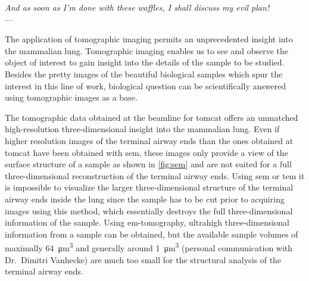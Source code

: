 \acresetall
{}\label{ch:discussion}
\begin{flushright}{\slshape And as soon as I'm done with these waffles, I shall discuss my evil plan!} \\ \medskip
	---  \citep{Zim}
\end{flushright}

\vfill

The application of tomographic imaging permits an unprecedented insight into the mammalian lung. Tomographic imaging enables us to see and observe the object of interest to gain insight into the details of the sample to be studied. Besides the pretty images of the beautiful biological samples which spur the interest in this line of work, biological question can be scientifically answered using tomographic images as a base.

The tomographic data obtained at the beamline for \ac{tomcat} offers an unmatched high-resolution three-dimensional insight into the mammalian lung. Even if higher resolution images of the terminal airway ends than the ones obtained at \ac{tomcat} have been obtained with \ac{sem}, these images only provide a view of the surface structure of a sample as shown in \autoref{fig:sem} and are not suited for a full three-dimensional reconstruction of the terminal airway ends. Using \ac{sem} or \ac{tem} it is impossible to visualize the larger three-dimensional structure of the terminal airway ends inside the lung since the sample has to be cut prior to acquiring images using this method, which essentially destroys the full three-dimensional information of the sample. Using \ac{em}-tomography, ultrahigh three-dimensional information from a sample can be obtained, but the available sample volumes of maximally \SI{64}{\micro\meter\cubed} and generally around \SI{1}{\micro\meter\cubed} (personal communication with Dr.\ Dimitri Vanhecke) are much too small for the structural analysis of the terminal airway ends.

